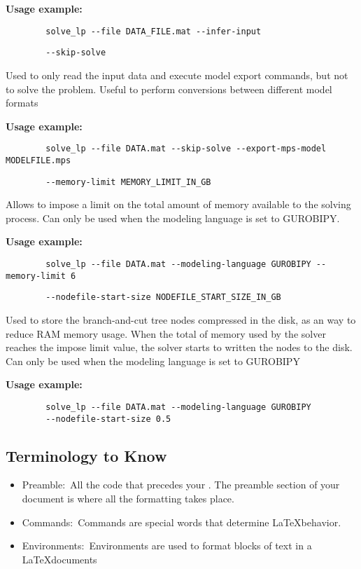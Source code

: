 \documentclass[12pt,hidelinks]{article}
\begin{document}
	\textbf{Usage example:} 
	\begin{verbatim}
		solve_lp --file DATA_FILE.mat --infer-input
	\end{verbatim}

	{\color{mordantred19}
	\begin{verbatim}
		--skip-solve
	\end{verbatim}
	} Used to only read the input data and execute model export commands, but not to solve the problem. Useful to perform conversions between different model formats

	\textbf{Usage example:} 
	\begin{verbatim}
		solve_lp --file DATA.mat --skip-solve --export-mps-model MODELFILE.mps
	\end{verbatim}

	{\color{mordantred19}
	\begin{verbatim}
		--memory-limit MEMORY_LIMIT_IN_GB
	\end{verbatim}
	} Allows to impose a limit on the total amount of memory available to the solving process. Can only be used when the modeling language is set to GUROBIPY.

	\textbf{Usage example:} 
	\begin{verbatim}
		solve_lp --file DATA.mat --modeling-language GUROBIPY --memory-limit 6
	\end{verbatim}

	{\color{mordantred19}
	\begin{verbatim}
		--nodefile-start-size NODEFILE_START_SIZE_IN_GB
	\end{verbatim}
	} Used to store the branch-and-cut tree nodes compressed in the disk, as an way to reduce RAM memory usage. When the total of memory used by the solver reaches the impose limit value, the solver starts to written the nodes to the disk. Can only be used when the modeling language is set to GUROBIPY

	\textbf{Usage example:} 
	\begin{verbatim}
		solve_lp --file DATA.mat --modeling-language GUROBIPY
		--nodefile-start-size 0.5
	\end{verbatim}



	\subsection{Terminology to Know}
			\begin{itemize}
				\item Preamble:\, All the code that precedes your . The preamble section of your document is where all the formatting takes place. 
				\item Commands:\, Commands are special words that determine \LaTeX behavior.
				\item Environments:\, Environments are used to format blocks of text in a \LaTeX documents
			\end{itemize}
\end{document}
